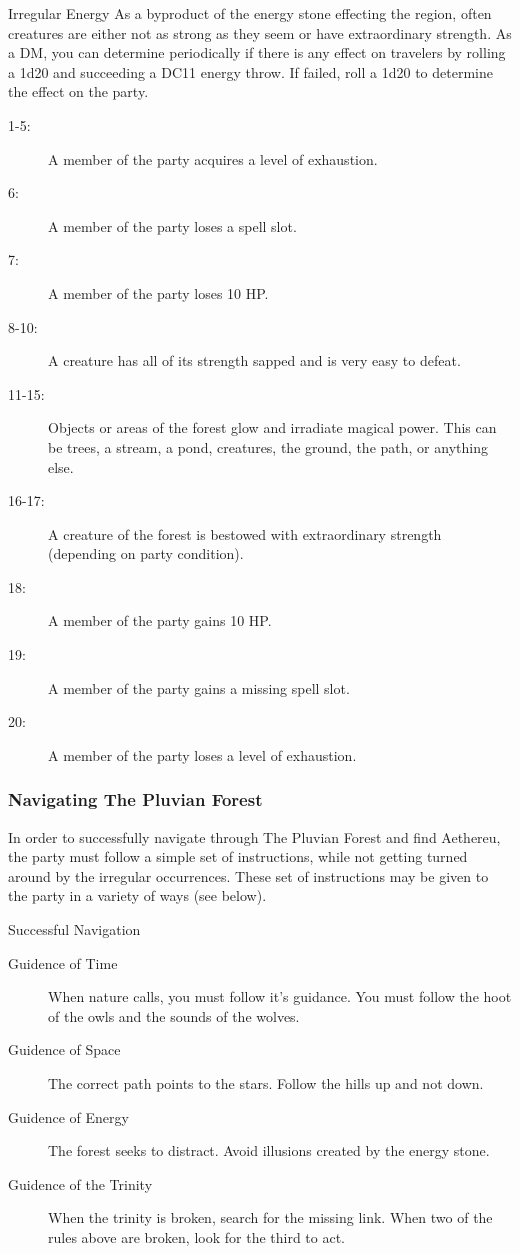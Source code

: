 \begin{commentbox}{Irregular Energy}
	As a byproduct of the energy stone effecting the region, often creatures are either not as strong as they seem or have extraordinary strength. As a DM, you can determine periodically if there is any effect on travelers by rolling a 1d20 and succeeding a DC11 energy throw. If failed, roll a 1d20 to determine the effect on the party.
	\hline
	\begin{description}
		\item[1-5:] A member of the party acquires a level of exhaustion.
		\item[6:] A member of the party loses a spell slot.
		\item[7:] A member of the party loses 10 HP.
		\item[8-10:] A creature has all of its strength sapped and is very easy to defeat.
		\item[11-15:] Objects or areas of the forest glow and irradiate magical power. This can be trees, a stream, a pond, creatures, the ground, the path, or anything else. 
		\item[16-17:] A creature of the forest is bestowed with extraordinary strength (depending on party condition).
		\item[18:] A member of the party gains 10 HP. 
		\item[19:] A member of the party gains a missing spell slot. 
		\item[20:] A member of the party loses a level of exhaustion.
	\end{description}
\end{commentbox}

\subsubsection{Navigating The Pluvian Forest}

In order to successfully navigate through The Pluvian Forest and find Aethereu, the party must follow a simple set of instructions, while not getting turned around by the irregular occurrences. These set of instructions may be given to the party in a variety of ways (see below). 

\begin{commentbox}{Successful Navigation}
	\begin{description}
		\item[Guidence of Time] When nature calls, you must follow it's guidance. You must follow the hoot of the owls and the sounds of the wolves.
		\item[Guidence of Space] The correct path points to the stars. Follow the hills up and not down.
		\item[Guidence of Energy] The forest seeks to distract. Avoid illusions created by the energy stone.
		\item[Guidence of the Trinity] When the trinity is broken, search for the missing link. When two of the rules above are broken, look for the third to act.
	\end{description}
\end{commentbox}

